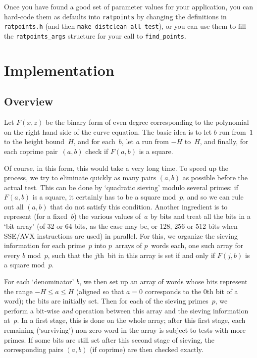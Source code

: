 \documentclass[12pt,a4paper,oneside]{amsart}
\begin{document}
Once you have found a good set of parameter values for your application,
you can hard-code them as defaults into \texttt{ratpoints} by changing the
definitions in \texttt{ratpoints.h} (and then \texttt{make distclean all test}),
or you can use them to fill the \texttt{ratpoints\_args} structure for
your call to \texttt{find\_points}.


\section{Implementation} \label{impl}

\subsection{Overview}

Let $F(x, z)$ be the binary form of even degree corresponding to the
polynomial on the right hand side of the curve equation. The basic idea
is to let $b$ run from~$1$ to the height bound~$H$, and for each~$b$, let
$a$ run from $-H$ to~$H$, and finally, for each coprime pair~$(a,b)$ check
if $F(a, b)$ is a square.

Of course, in this form, this would take a very long time. To speed up the
process, we try to eliminate quickly as many pairs $(a, b)$ as possible
before the actual test. This can be done by `quadratic sieving' modulo
several primes: if $F(a, b)$ is a square, it certainly has to be a square
mod~$p$, and so we can rule out all $(a, b)$ that do not satisfy this
condition. Another ingredient is to represent (for a fixed~$b$) the
various values of~$a$ by bits and treat all the bits in a `bit array'
(of 32 or 64 bits, as the case may be, or 128, 256 or 512 bits when SSE/AVX
instructions are used) in parallel. For this, we organize
the sieving information for each prime~$p$ into $p$~arrays of $p$~words
each, one such array for every $b$ mod~$p$, such that the $j$th~bit
in this array is set if and only if $F(j, b)$ is a square mod~$p$.

For each `denominator' $b$, we then set up an array of words whose bits
represent the range $-H \le a \le H$ (aligned so that $a = 0$ corresponds
to the $0$th bit of a word); the bits are initially set. Then for each
of the sieving primes~$p$, we perform a bit-wise {\em and} operation
between this array and the sieving information at~$p$. In a first stage,
this is done on the whole array; after this first stage, each remaining
(`surviving') non-zero word in the array is subject to tests with more
primes. If some bits are still set after this second stage of sieving,
the corresponding pairs $(a, b)$ (if coprime) are then checked exactly.
\end{document}
